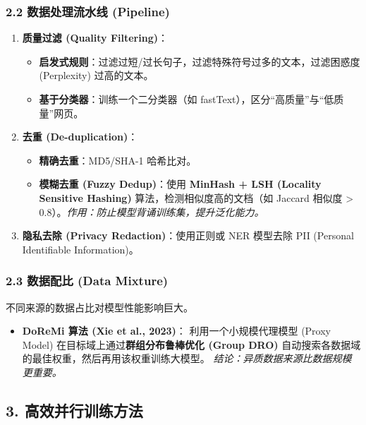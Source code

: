 \documentclass[a4paper, 11pt]{ctexart}
\begin{document}
\subsubsection{2.2 数据处理流水线 (Pipeline)}
\begin{enumerate}
    \item \textbf{质量过滤 (Quality Filtering)}：
    \begin{itemize}
        \item \textbf{启发式规则}：过滤过短/过长句子，过滤特殊符号过多的文本，过滤困惑度 (Perplexity) 过高的文本。
        \item \textbf{基于分类器}：训练一个二分类器（如 fastText），区分“高质量”与“低质量”网页。
    \end{itemize}
    \item \textbf{去重 (De-duplication)}：
    \begin{itemize}
        \item \textbf{精确去重}：MD5/SHA-1 哈希比对。
        \item \textbf{模糊去重 (Fuzzy Dedup)}：使用 \textbf{MinHash + LSH (Locality Sensitive Hashing)} 算法，检测相似度高的文档（如 Jaccard 相似度 > 0.8）。\textit{作用：防止模型背诵训练集，提升泛化能力。}
    \end{itemize}
    \item \textbf{隐私去除 (Privacy Redaction)}：使用正则或 NER 模型去除 PII (Personal Identifiable Information)。
\end{enumerate}

\subsubsection{2.3 数据配比 (Data Mixture)}
不同来源的数据占比对模型性能影响巨大。
\begin{itemize}
    \item \textbf{DoReMi 算法 (Xie et al., 2023)}：
    利用一个小规模代理模型 (Proxy Model) 在目标域上通过\textbf{群组分布鲁棒优化 (Group DRO)} 自动搜索各数据域的最佳权重，然后再用该权重训练大模型。
    \textit{结论：异质数据来源比数据规模更重要。}
\end{itemize}

\subsection{3. 高效并行训练方法}
\end{document}
